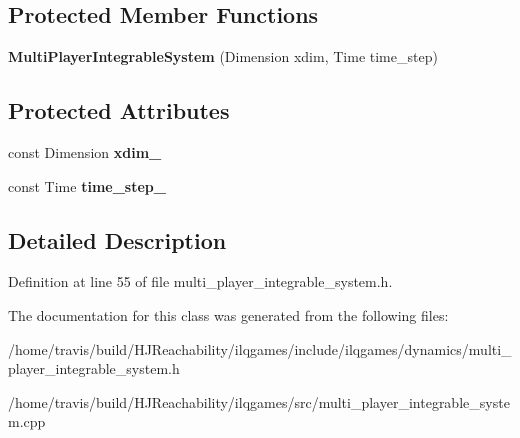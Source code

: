 \subsection*{Protected Member Functions}
\begin{DoxyCompactItemize}
\item 
{\bfseries Multi\+Player\+Integrable\+System} (Dimension xdim, Time time\+\_\+step)\hypertarget{classilqgames_1_1_multi_player_integrable_system_a7b66a8aa057ed007006d884b5fe333af}{}\label{classilqgames_1_1_multi_player_integrable_system_a7b66a8aa057ed007006d884b5fe333af}

\end{DoxyCompactItemize}
\subsection*{Protected Attributes}
\begin{DoxyCompactItemize}
\item 
const Dimension {\bfseries xdim\+\_\+}\hypertarget{classilqgames_1_1_multi_player_integrable_system_ad6f5958f0f51492aa1d368765f417a19}{}\label{classilqgames_1_1_multi_player_integrable_system_ad6f5958f0f51492aa1d368765f417a19}

\item 
const Time {\bfseries time\+\_\+step\+\_\+}\hypertarget{classilqgames_1_1_multi_player_integrable_system_adbd2c27a82e441fab50201f583a869f2}{}\label{classilqgames_1_1_multi_player_integrable_system_adbd2c27a82e441fab50201f583a869f2}

\end{DoxyCompactItemize}


\subsection{Detailed Description}


Definition at line 55 of file multi\+\_\+player\+\_\+integrable\+\_\+system.\+h.



The documentation for this class was generated from the following files\+:\begin{DoxyCompactItemize}
\item 
/home/travis/build/\+H\+J\+Reachability/ilqgames/include/ilqgames/dynamics/multi\+\_\+player\+\_\+integrable\+\_\+system.\+h\item 
/home/travis/build/\+H\+J\+Reachability/ilqgames/src/multi\+\_\+player\+\_\+integrable\+\_\+system.\+cpp\end{DoxyCompactItemize}
